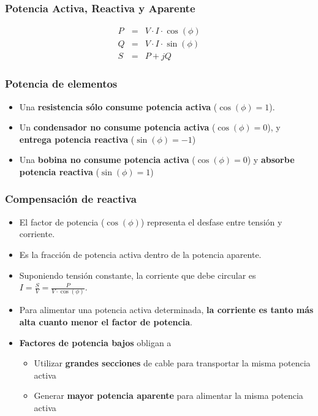 \documentclass[serif, xcolor=dvipsnames]{beamer}
\begin{document}
\begin{frame}
  \frametitle{Potencia Activa, Reactiva y Aparente}

\begin{eqnarray*}
  P & = & V\cdot I\cdot\cos(\phi)\\
  Q & = & V\cdot I\cdot\sin(\phi)\\
  S & = & P+jQ
\end{eqnarray*}



\end{frame}
\begin{frame}
  \frametitle{Potencia de elementos}
  \begin{itemize}
  \item Una \textbf{resistencia sólo consume potencia activa}
    ($\cos(\phi)=1$).
  \item Un \textbf{condensador no consume potencia activa}
    ($\cos(\phi)=0$), y \textbf{entrega potencia reactiva}
    ($\sin(\phi)=-1$)
  \item Una \textbf{bobina no consume potencia activa}
    ($\cos(\phi)=0$) y \textbf{absorbe potencia reactiva}
    ($\sin(\phi)=1$)
  \end{itemize}

\end{frame}
\begin{frame}
  \frametitle{Compensación de reactiva}
  \begin{itemize}
  \item El factor de potencia ($\cos(\phi)$) representa el desfase
    entre tensión y corriente.
  \item Es la fracción de potencia activa dentro de la potencia
    aparente.
  \item Suponiendo tensión constante, la corriente que debe circular
    es $I=\frac{S}{V}=\frac{P}{V\cdot\cos(\phi)}$.
  \item Para alimentar una potencia activa determinada, \textbf{la
      corriente es tanto más alta cuanto menor el factor de potencia}.
  \item \textbf{Factores de potencia bajos} obligan a

    \begin{itemize}
    \item Utilizar \textbf{grandes secciones} de cable para
      transportar la misma potencia activa
    \item Generar \textbf{mayor potencia aparente} para alimentar la
      misma potencia activa
    \end{itemize}
  \end{itemize}

\end{frame}
\end{document}
